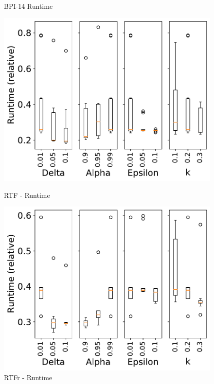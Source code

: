 \documentclass[landscape]{article}
\begin{document}
\begin{figure}[!htb]
\begin{minipage}{0.2\textwidth}
		\caption{BPI-14 Runtime}
	\end{minipage}
	\hfill
	\begin{minipage}{0.2\textwidth}
		\includegraphics[width=1.0\textwidth]{../Road_Traffic_Fines_Management_Process/Road_Traffic_Fines_Management_Process_param_time_Approx_k02.pdf}
		\caption{RTF - Runtime}
	\end{minipage}
	\hfill
	\begin{minipage}{0.2\textwidth}
		\includegraphics[width=1.0\textwidth]{../RTFM_model2/RTFM_model2_param_time_Approx_k02.pdf}
		\caption{RTFr - Runtime}
	\end{minipage}
\end{figure}
\end{document}
